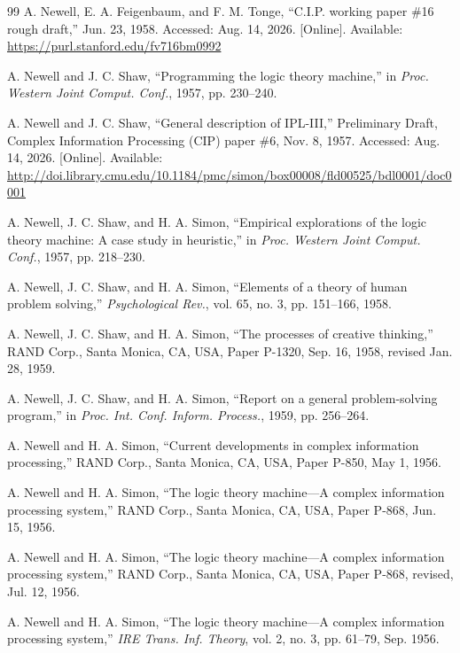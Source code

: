 \documentclass{IEEEcsmag}
\begin{document}
\begin{thebibliography}{99}
 A. Newell, E. A. Feigenbaum, and F. M. Tonge,
  ``C.I.P. working paper \#16 rough draft,'' Jun. 23, 1958.
  Accessed: Aug. 14, 2026.  [Online].
  Available: \url{https://purl.stanford.edu/fv716bm0992}

 A. Newell and J. C. Shaw, ``Programming the
  logic theory machine,'' in \textit{Proc. Western Joint
  Comput. Conf.}, 1957, pp. 230--240.

 A. Newell and J. C. Shaw,
  ``General description of IPL-III,''
  Preliminary Draft, Complex Information Processing (CIP) paper \#6,
  Nov. 8, 1957.
  Accessed: Aug. 14, 2026.  [Online].
  Available: \url{http://doi.library.cmu.edu/10.1184/pmc/simon/box00008/fld00525/bdl0001/doc0001}

 A. Newell, J. C. Shaw, and H. A. Simon, ``Empirical
  explorations of the logic theory machine: A case study in
  heuristic,'' in \textit{Proc. Western Joint Comput. Conf.}, 1957,
  pp. 218--230.

 A. Newell, J. C. Shaw, and H. A. Simon,
  ``Elements of a theory of human problem solving,''
  \textit{Psychological Rev.}, vol. 65, no. 3, pp. 151--166, 1958.

 A. Newell, J. C. Shaw, and H. A. Simon,
  ``The processes of creative thinking,''
  RAND Corp., Santa Monica, CA, USA, Paper P-1320,
  Sep. 16, 1958, revised Jan. 28, 1959.

 A. Newell, J. C. Shaw, and H. A. Simon,
  ``Report on a general problem-solving program,'' in
  \textit{Proc. Int. Conf. Inform. Process.}, 1959, pp. 256--264.

 A. Newell and H. A. Simon,
  ``Current developments in complex information processing,''
  RAND Corp., Santa Monica, CA, USA, Paper P-850, May 1, 1956.

 A. Newell and H. A. Simon,
  ``The logic theory machine---A complex information processing system,''
  RAND Corp., Santa Monica, CA, USA, Paper P-868, Jun. 15, 1956.

 A. Newell and H. A. Simon,
  ``The logic theory machine---A complex information processing system,''
  RAND Corp., Santa Monica, CA, USA, Paper P-868, revised, Jul. 12, 1956.

 A. Newell and H. A. Simon, ``The logic theory
  machine---A complex information processing system,'' \textit{IRE
  Trans. Inf. Theory}, vol. 2, no. 3, pp. 61--79, Sep. 1956.


\end{thebibliography}
\end{document}
